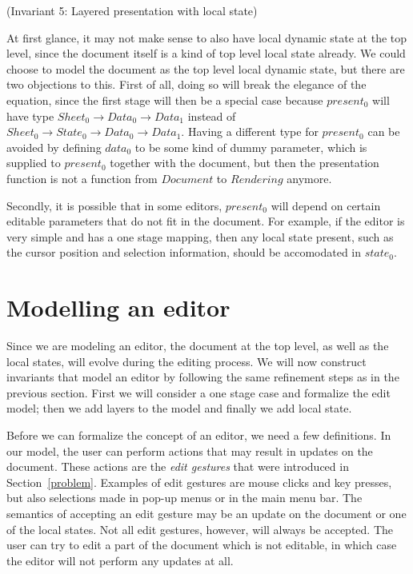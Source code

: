 {\centering (Invariant 5: Layered presentation with local state)\\}\vspace{1em}

At first glance, it may not make sense to also have local dynamic state at the top level, since the document itself is a kind of top level local state already. We could choose to model the document as the top level local dynamic state, but there are two objections to this. First of all, doing so will break the elegance of the equation, since the first stage will then be a special case because $present_0$ will have type $Sheet_0 \rightarrow Data_0 \rightarrow Data_1$ instead of $Sheet_0 \rightarrow State_0 \rightarrow Data_0 \rightarrow Data_1$. Having a different type for $present_0$ can be avoided by defining $data_0$ to be some kind of dummy parameter, which is supplied to $present_0$ together with the document, but then the presentation function is not a function from $Document$ to $Rendering$ anymore. 

Secondly, it is possible that in some editors, $present_0$ will depend on certain editable parameters that do not fit in the document. For example, if the editor is very simple and has a one stage mapping, then any local state present, such as the cursor position and selection information, should be accomodated in $state_0$.
\section{Modelling an editor}
\label{editing}

Since we are modeling an editor, the document at the top level, as well as the local states, will evolve during the editing process. We will now construct invariants that model an editor by following the same refinement steps as in the previous section. First we will consider a one stage case and formalize the edit model; then we add layers to the model and finally we add local state.

Before we can formalize the concept of an editor, we need a few definitions. In our model, the user can perform actions that may result in updates on the document. These actions are the {\em edit gestures} that were introduced in Section~\ref{problem}. Examples of edit gestures are mouse clicks and key presses, but also selections made in pop-up menus or in the main menu bar. The semantics of accepting an edit gesture may be an update on the document or one of the local states. Not all edit gestures, however, will always be accepted. The user can try to edit a part of the document which is not editable, in which case the editor will not perform any updates at all.
      

